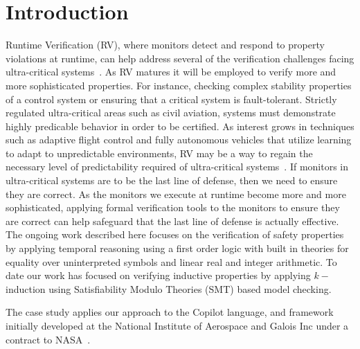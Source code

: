 \section{Introduction}\label{sec:intro}
Runtime Verification (RV), where monitors detect and respond to
property violations at runtime, can help address several of the
verification challenges facing ultra-critical
systems~\cite{pike-rv-11}.  As RV matures
it will be employed to verify more and more sophisticated
properties. For instance, checking complex stability properties of a
control system or ensuring that a critical system is fault-tolerant.
Strictly regulated ultra-critical areas such as civil aviation,
systems must demonstrate highly predicable behavior in order to be
certified. As interest grows in techniques such as adaptive flight
control and fully autonomous vehicles that utilize learning to adapt
to unpredictable environments, RV may be a way to regain the necessary
level of predictability required of ultra-critical
systems~\cite{simplex}.  If
monitors in ultra-critical systems are to be the last line of defense,
then we need to ensure they are correct.  As the monitors we execute
at runtime become more and more sophisticated, applying formal
verification tools to the monitors to ensure they are correct can help
safeguard that the last line of defense is actually effective. The
ongoing work described here focuses on the verification of safety
properties by applying temporal reasoning using a first order logic
with built in theories for equality over uninterpreted symbols and
linear real and integer arithmetic. To date our work has focused on
verifying inductive properties by applying $k-$induction using
Satisfiability Modulo Theories (SMT) based model checking. 

The case study applies our approach to the Copilot language, and
 framework initially developed at the National Institute of Aerospace
 and Galois Inc under a contract to NASA~\cite{copilot,pike-isse-13}.  




  







